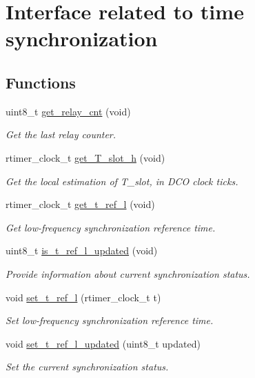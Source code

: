 \hypertarget{group__glossy__sync}{
\section{Interface related to time synchronization}
\label{group__glossy__sync}
}
\subsection*{Functions}
\begin{DoxyCompactItemize}
\item 
uint8\_\-t \hyperlink{group__glossy__sync_ga2cb03b56f27f6f7f0b4ebf0ec6ba8333}{get\_\-relay\_\-cnt} (void)
\begin{DoxyCompactList}\small\item\em Get the last relay counter. \end{DoxyCompactList}\item 
rtimer\_\-clock\_\-t \hyperlink{group__glossy__sync_ga00e1a87bdb504b0819a7b5d6c637eaa8}{get\_\-T\_\-slot\_\-h} (void)
\begin{DoxyCompactList}\small\item\em Get the local estimation of T\_\-slot, in DCO clock ticks. \end{DoxyCompactList}\item 
rtimer\_\-clock\_\-t \hyperlink{group__glossy__sync_gaa37a5474c90f7747d0f5054dc1a03764}{get\_\-t\_\-ref\_\-l} (void)
\begin{DoxyCompactList}\small\item\em Get low-\/frequency synchronization reference time. \end{DoxyCompactList}\item 
uint8\_\-t \hyperlink{group__glossy__sync_gae7e475746ec86ae6dd8ca9ece642faf8}{is\_\-t\_\-ref\_\-l\_\-updated} (void)
\begin{DoxyCompactList}\small\item\em Provide information about current synchronization status. \end{DoxyCompactList}\item 
void \hyperlink{group__glossy__sync_gac14ac43f69412b67d2d326b32c2d9014}{set\_\-t\_\-ref\_\-l} (rtimer\_\-clock\_\-t t)
\begin{DoxyCompactList}\small\item\em Set low-\/frequency synchronization reference time. \end{DoxyCompactList}\item 
void \hyperlink{group__glossy__sync_ga189faa7cc7395e8895e1ddcbd645f14e}{set\_\-t\_\-ref\_\-l\_\-updated} (uint8\_\-t updated)
\begin{DoxyCompactList}\small\item\em Set the current synchronization status. \end{DoxyCompactList}\end{DoxyCompactItemize}


